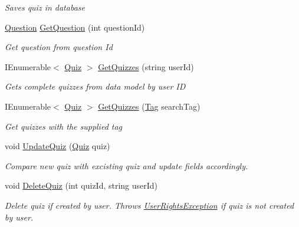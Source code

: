 \begin{DoxyCompactItemize}
\begin{DoxyCompactList}\small\item\em Saves quiz in database \end{DoxyCompactList}\item 
\hyperlink{class_website_1_1_models_1_1_question}{Question} \hyperlink{class_website_1_1_models_1_1_quiz_model_ae5fa893b1012365b9b84dd24027de3b8}{Get\+Question} (int question\+Id)
\begin{DoxyCompactList}\small\item\em Get question from question Id \end{DoxyCompactList}\item 
I\+Enumerable$<$ \hyperlink{class_website_1_1_models_1_1_quiz}{Quiz} $>$ \hyperlink{class_website_1_1_models_1_1_quiz_model_a1dfad55398167ca0d4403db092f55e1a}{Get\+Quizzes} (string user\+Id)
\begin{DoxyCompactList}\small\item\em Gets complete quizzes from data model by user I\+D \end{DoxyCompactList}\item 
I\+Enumerable$<$ \hyperlink{class_website_1_1_models_1_1_quiz}{Quiz} $>$ \hyperlink{class_website_1_1_models_1_1_quiz_model_a7d8f2d633daa6b4605a34902aad6acf4}{Get\+Quizzes} (\hyperlink{class_website_1_1_models_1_1_tag}{Tag} search\+Tag)
\begin{DoxyCompactList}\small\item\em Get quizzes with the supplied tag \end{DoxyCompactList}\item 
void \hyperlink{class_website_1_1_models_1_1_quiz_model_aa93953e8be59eb0d0e884588d9ce4722}{Update\+Quiz} (\hyperlink{class_website_1_1_models_1_1_quiz}{Quiz} quiz)
\begin{DoxyCompactList}\small\item\em Compare new quiz with excisting quiz and update fields accordingly. \end{DoxyCompactList}\item 
void \hyperlink{class_website_1_1_models_1_1_quiz_model_a8c128e617de65e219d391218a98c319d}{Delete\+Quiz} (int quiz\+Id, string user\+Id)
\begin{DoxyCompactList}\small\item\em Delete quiz if created by user. Throws \hyperlink{class_website_1_1_models_1_1_user_rights_exception}{User\+Rights\+Exception} if quiz is not created by user. \end{DoxyCompactList}\item 

\end{DoxyCompactItemize}
